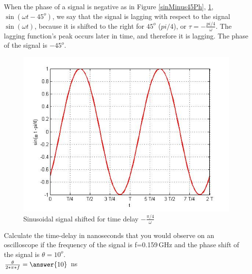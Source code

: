 \documentclass{ximera}
\begin{document}
\begin{example}
\item When the phase of a signal is negative as in Figure \ref{sinMinus45Ph}, \ref{sinMinus45T},  $ \sin (\omega t - 45^o)$, we say that the signal is lagging with respect to the signal $ \sin (\omega t)$, because it is shifted to the right for $45^o$ ($pi/4$), or $\tau=-\frac{pi/4}{\omega} $. The lagging function's peak occurs later in time, and therefore it is lagging. The phase of the signal is $-45^o$.


\begin{figure}[htbp]
\begin{center}
\includegraphics[scale=0.4]{jpg/cpef2.jpg}
\caption{ Sinusoidal signal shifted for time delay $-\frac{\pi/4}{\omega}$}
\label{sinMinus45T}
\end{center}
\end{figure}



\end{example}


\begin{question}  
Calculate the time-delay in nanoseconds that you would observe on an oscilloscope if the frequency of the signal is f=0.159\,GHz and the phase shift of the signal is $\theta=10^o$. \\
$ \frac{\theta}{2*\pi*f} = \answer{10}$  ns
\end{question} 
\end{document}
